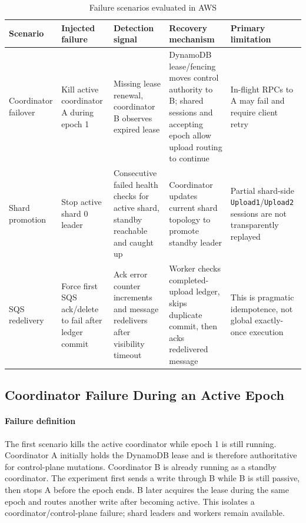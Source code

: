 \documentclass[conference]{IEEEtran}
\begin{document}
\begin{table}[!t]
\centering
\caption{Failure scenarios evaluated in AWS}
\label{tab:failure-scenarios}
\small
\begin{tabular}{p{2.7cm} p{3.0cm} p{3.0cm} p{4.0cm} p{3.1cm}}
\hline
\textbf{Scenario} & \textbf{Injected failure} & \textbf{Detection signal} & \textbf{Recovery mechanism} & \textbf{Primary limitation} \\
\hline
Coordinator failover & Kill active coordinator A during epoch 1 & Missing lease renewal, coordinator B observes expired lease & DynamoDB lease/fencing moves control authority to B; shared sessions and accepting epoch allow upload routing to continue & In-flight RPCs to A may fail and require client retry \\
Shard promotion & Stop active shard 0 leader & Consecutive failed health checks for active shard, standby reachable and caught up & Coordinator updates current shard topology to promote standby leader & Partial shard-side \texttt{Upload1}/\texttt{Upload2} sessions are not transparently replayed \\
SQS redelivery & Force first SQS ack/delete to fail after ledger commit & Ack error counter increments and message redelivers after visibility timeout & Worker checks completed-upload ledger, skips duplicate commit, then acks redelivered message & This is pragmatic idempotence, not global exactly-once execution \\
\hline
\end{tabular}
\end{table}

\subsection{Coordinator Failure During an Active Epoch}

\paragraph{Failure definition}
The first scenario kills the active coordinator while epoch 1 is still running. Coordinator A initially holds the DynamoDB lease and is therefore authoritative for control-plane mutations. Coordinator B is already running as a standby coordinator. The experiment first sends a write through B while B is still passive, then stops A before the epoch ends. B later acquires the lease during the same epoch and routes another write after becoming active. This isolates a coordinator/control-plane failure; shard leaders and workers remain available.
\end{document}
